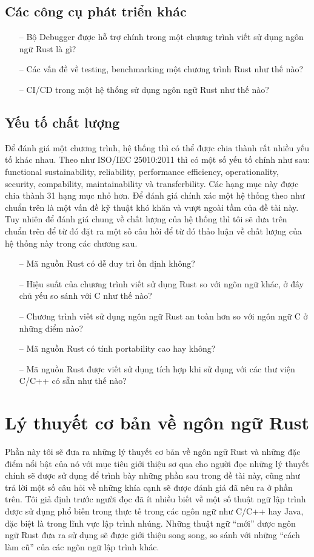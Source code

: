 \subsection{Các công cụ phát triển khác}
\begin{itemize}
    \item[--] Bộ Debugger được hỗ trợ chính trong một chương trình viết sử dụng ngôn ngữ Rust là gì?
    \item[--] Các vấn đề về testing, benchmarking một chương trình Rust như thế nào?
    \item[--] CI/CD trong một hệ thống sử dụng ngôn ngữ Rust như thế nào?
\end{itemize}

\subsection{Yếu tố chất lượng}\label{lbl:quality_iso}
Để đánh giá một chương trình, hệ thống thì có thể được chia thành rất nhiều yếu tố khác nhau.
Theo như ISO/IEC 25010:2011 thì có một số yếu tố chính như sau: functional sustainability, reliability, performance efficiency, operationality, security, compability, maintainability và transferbility. Các hạng mục này được chia thành 31 hạng mục nhỏ hơn.
Để đánh giá chính xác một hệ thống theo như chuẩn trên là một vấn đề kỹ thuật khó khăn và vượt ngoài tầm của đề tài này.
Tuy nhiên để đánh giá chung về chất lượng của hệ thống thì tôi sẽ dưa trên chuẩn trên để từ đó đặt ra một số câu hỏi để từ đó thảo luận về chất lượng của hệ thống này trong các chương sau.
\begin{itemize}
    \item[--] Mã nguồn Rust có dễ duy trì ồn định không?
    \item[--] Hiệu suất của chương trình viết sử dụng Rust so với ngôn ngữ khác, ở đây chủ yếu so sánh với C như thế nào?
    \item[--] Chương trình viết sử dụng ngôn ngữ Rust an toàn hơn so với ngôn ngữ C ở những điểm nào?
    \item[--] Mã nguồn Rust có tính portability cao hay không?
    \item[--] Mã nguồn Rust được viết sử dụng tích hợp khi sử dụng với các thư viện C/C++ có sẵn như thế nào?
\end{itemize}

\section{Lý thuyết cơ bản về ngôn ngữ Rust}
Phần này tôi sẽ đưa ra những lý thuyết cơ bản về ngôn ngữ Rust và những đặc điểm nổi bật của nó với mục tiêu giới thiệu sơ qua cho người đọc những lý thuyết chính sẽ được sử dụng để trình bày những phần sau trong đề tài này, cũng như trả lời một số câu hỏi về những khía cạnh sẽ được đánh giá đã nêu ra ở phần trên.
Tôi giả định trước người đọc đã ít nhiều biết về một số thuật ngữ lập trình được sử dụng phổ biến trong thực tế trong các ngôn ngữ như C/C++ hay Java, đặc biệt là trong lĩnh vực lập trình nhúng.
Những thuật ngữ ``mới'' được ngôn ngữ Rust đưa ra sử dụng sẽ được giới thiệu song song, so sánh với những ``cách làm cũ'' của các ngôn ngữ lập trình khác.

